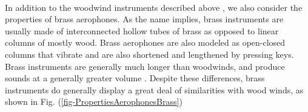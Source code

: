 \documentclass[12pt,letterpaper]{article}
\begin{document}
\paragraph*{}In addition to the woodwind instruments described above , we also consider the properties of brass aerophones. As the name implies, brass instruments are usually made of interconnected hollow tubes of brass as opposed to linear columns of mostly wood. Brass aerophones are also modeled as open-closed columns that vibrate and are also shortened and lengthened by pressing keys. Brass instruments are generally much longer than woodwinds, and produce sounds at a generally greater volume \cite{Olson}. Despite these differences, brass instruments do generally display a great deal of similarities with wood winds, as shown in Fig. (\ref{fig-PropertiesAerophonesBrass})
\end{document}
